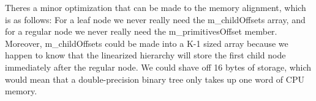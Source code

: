 
\begin{DoxyRefList}
\item[Class \mbox{\hyperlink{classBVH_1_1LinearNodeT}{BVH\+::Linear\+NodeT$<$ T, P, BV, K $>$}} ]\label{todo__todo000001}%
%
There\textquotesingle{}s a minor optimization that can be made to the memory alignment, which is as follows\+: For a leaf node we never really need the m\+\_\+child\+Offsets array, and for a regular node we never really need the m\+\_\+primitives\+Offset member. Moreover, m\+\_\+child\+Offsets could be made into a K-\/1 sized array because we happen to know that the linearized hierarchy will store the first child node immediately after the regular node. We could shave off 16 bytes of storage, which would mean that a double-\/precision binary tree only takes up one word of CPU memory. 
\end{DoxyRefList}